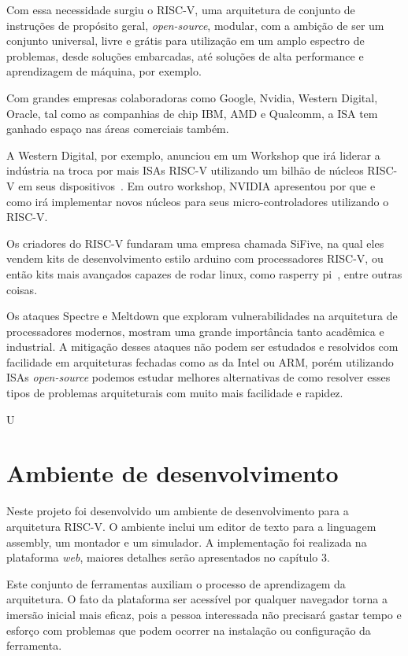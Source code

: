 		Com essa necessidade surgiu o RISC-V, uma arquitetura de conjunto de instruções de propósito geral, \textit{open-source}, modular, com a ambição de ser um conjunto universal, livre e grátis para utilização em um amplo espectro de problemas, desde soluções embarcadas, até soluções de alta performance e aprendizagem de máquina, por exemplo.

		Com grandes empresas colaboradoras como Google, Nvidia, Western Digital, Oracle, tal como as companhias de chip IBM, AMD e Qualcomm, a ISA tem ganhado espaço nas áreas comerciais também.

		A Western Digital, por exemplo, anunciou em um Workshop que irá liderar a indústria na troca por mais ISAs RISC-V utilizando um bilhão de núcleos RISC-V em seus dispositivos~\cite{riscv_commercial}. Em outro workshop, NVIDIA apresentou por que e como irá implementar novos núcleos para seus micro-controladores utilizando o RISC-V.~\cite{riscv_nvidia}

		Os criadores do RISC-V fundaram uma empresa chamada SiFive, na qual eles vendem kits de desenvolvimento estilo arduino com processadores RISC-V, ou então kits mais avançados capazes de rodar linux, como rasperry pi~\cite{raspberrypi}, entre outras coisas.

		Os ataques Spectre e Meltdown que exploram vulnerabilidades na arquitetura de processadores modernos, mostram uma grande importância tanto acadêmica e industrial. A mitigação desses ataques não podem ser estudados e resolvidos com facilidade em arquiteturas fechadas como as da Intel ou ARM, porém utilizando ISAs \textit{open-source} podemos estudar melhores alternativas de como resolver esses tipos de problemas arquiteturais com muito mais facilidade e rapidez.

		U



	\section{Ambiente de desenvolvimento}

		Neste projeto foi desenvolvido um ambiente de desenvolvimento para a arquitetura RISC-V. O ambiente inclui um editor de texto para a linguagem assembly, um montador e um simulador. A implementação foi realizada na plataforma \textit{web}, maiores detalhes serão apresentados no capítulo 3. 

		Este conjunto de ferramentas auxiliam o processo de aprendizagem da arquitetura. O fato da plataforma ser acessível por qualquer navegador torna a imersão inicial mais eficaz, pois a pessoa interessada não precisará gastar tempo e esforço com problemas que podem ocorrer na instalação ou configuração da ferramenta.


